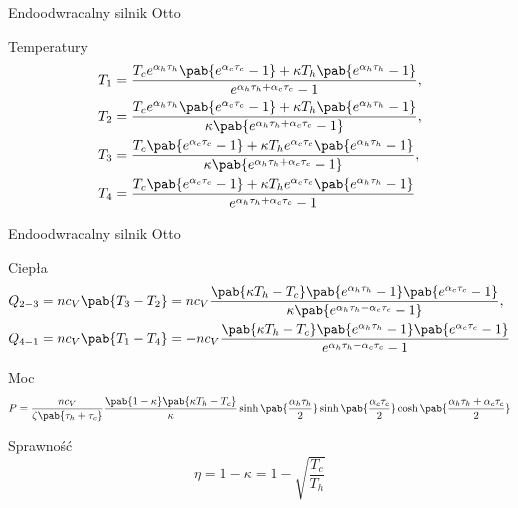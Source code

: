 \documentclass[aspectratio=1610]{beamer}
\begin{document}
\begin{frame}{Endoodwracalny silnik Otto}
\begin{block}{Temperatury}
	\begin{align*}
		T_1 &= \frac{
			T_c e^{\alpha_h \tau_h} \pab{e^{\alpha_c \tau_c} - 1} + \kappa T_h \pab{e^{\alpha_h \tau_h} - 1}
		}{
			e^{\alpha_h \tau_h + \alpha_c \tau_c} - 1
		}, \\
		T_2 &= \frac{
			T_c e^{\alpha_h \tau_h} \pab{e^{\alpha_c \tau_c} - 1} + \kappa T_h \pab{e^{\alpha_h \tau_h} - 1}
		}{
			\kappa \pab{e^{\alpha_h \tau_h + \alpha_c \tau_c} - 1}
		}, \\
		T_3 &= \frac{
			T_c \pab{e^{\alpha_c \tau_c} - 1} + \kappa T_h e^{\alpha_c \tau_c} \pab{e^{\alpha_h \tau_h} - 1}
		}{
			\kappa \pab{e^{\alpha_h \tau_h + \alpha_c \tau_c} - 1}
		}, \\
		T_4 &= \frac{
			T_c \pab{e^{\alpha_c \tau_c} - 1} + \kappa T_h e^{\alpha_c \tau_c} \pab{e^{\alpha_h \tau_h} - 1}
		}{
			e^{\alpha_h \tau_h + \alpha_c \tau_c} - 1
		}
	\end{align*}
\end{block}
\end{frame}

\begin{frame}{Endoodwracalny silnik Otto}
\begin{block}{Ciepła}
	\begin{align*}
		Q_{2-3} &= n c_V \pab{T_3 - T_2} =
			n c_V \frac{
				\pab{\kappa T_h - T_c}\pab{e^{\alpha_h \tau_h} - 1}\pab{e^{\alpha_c \tau_c} - 1}
			}{
				\kappa \pab{e^{\alpha_h \tau_h - \alpha_c \tau_c} - 1}
			}, \\
		Q_{4-1} &= n c_V \pab{T_1 - T_4} =
			- n c_V \frac{
				\pab{\kappa T_h - T_c}\pab{e^{\alpha_h \tau_h} - 1}\pab{e^{\alpha_c \tau_c} - 1}
			}{
				e^{\alpha_h \tau_h - \alpha_c \tau_c} - 1
			}
	\end{align*}
\end{block}
\begin{block}{Moc}
	\begin{equation*}
		P = \frac{n c_V}{\zeta\pab{\tau_h + \tau_c}}
		\frac{\pab{1 - \kappa}\pab{\kappa T_h - T_c}}{\kappa}
		\sinh\pab{\frac{\alpha_h \tau_h}{2}}
		\sinh\pab{\frac{\alpha_c \tau_c}{2}}
		\cosh\pab{\frac{\alpha_h \tau_h + \alpha_c \tau_c}{2}}
	\end{equation*}
\end{block}
\begin{block}{Sprawność}
	\begin{equation*}
		\eta = 1 - \kappa = 1 - \sqrt{\frac{T_c}{T_h}}
	\end{equation*}
\end{block}
\end{frame}
\end{document}
